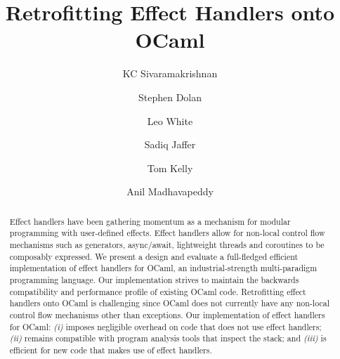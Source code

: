 \documentclass[sigplan,screen]{acmart}
\begin{document}
\title{Retrofitting Effect Handlers onto OCaml}

\author{KC Sivaramakrishnan}

\author{Stephen Dolan}

\author{Leo White}

\author{Sadiq Jaffer}

\author{Tom Kelly}

\author{Anil Madhavapeddy}

\begin{abstract}
Effect handlers have been gathering momentum as a mechanism for modular
	programming with user-defined effects. Effect handlers allow for non-local
	control flow mechanisms such as generators, async/await, lightweight threads
	and coroutines to be composably expressed.  We present a design and evaluate a
	full-fledged efficient implementation of effect handlers for OCaml, an
	industrial-strength multi-paradigm programming language. Our implementation
	strives to maintain the backwards compatibility and performance profile of
	existing OCaml code. Retrofitting effect handlers onto OCaml is challenging
	since OCaml does not currently have any non-local control flow mechanisms
	other than exceptions. Our implementation of effect handlers for OCaml: {\em
	(i)} imposes negligible overhead on code that does not use effect handlers;
	{\em (ii)} remains compatible with program analysis tools that inspect the
	stack; and {\em (iii)} is efficient for new code that makes use of effect
	handlers.
\end{abstract}
\end{document}
